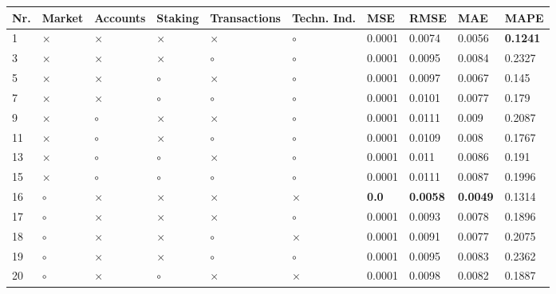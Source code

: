 \begin{table}[H]
\centering
\begin{tabular}{|P{0.7cm}|P{1.3cm}P{1.3cm}P{1.3cm}P{1.3cm}P{1.3cm}|P{1.1cm}P{1.1cm}P{1.1cm}P{1.1cm}|}
\hline
 Nr. &   Market & Accounts &  Staking & Transactions & Techn. Ind. &          MSE &            RMSE &             MAE &            MAPE \\
 & $\times$ & $\times$ & $\times$ &     $\times$ &     $\circ$ &       0.0001 &          0.0074 &          0.0056 & \textbf{0.1241} \\
   3 & $\times$ & $\times$ & $\times$ &      $\circ$ &     $\circ$ &       0.0001 &          0.0095 &          0.0084 &          0.2327 \\
   5 & $\times$ & $\times$ &  $\circ$ &     $\times$ &     $\circ$ &       0.0001 &          0.0097 &          0.0067 &           0.145 \\
   7 & $\times$ & $\times$ &  $\circ$ &      $\circ$ &     $\circ$ &       0.0001 &          0.0101 &          0.0077 &           0.179 \\
   9 & $\times$ &  $\circ$ & $\times$ &     $\times$ &     $\circ$ &       0.0001 &          0.0111 &           0.009 &          0.2087 \\
  11 & $\times$ &  $\circ$ & $\times$ &      $\circ$ &     $\circ$ &       0.0001 &          0.0109 &           0.008 &          0.1767 \\
  13 & $\times$ &  $\circ$ &  $\circ$ &     $\times$ &     $\circ$ &       0.0001 &           0.011 &          0.0086 &           0.191 \\
  15 & $\times$ &  $\circ$ &  $\circ$ &      $\circ$ &     $\circ$ &       0.0001 &          0.0111 &          0.0087 &          0.1996 \\
  16 &  $\circ$ & $\times$ & $\times$ &     $\times$ &    $\times$ & \textbf{0.0} & \textbf{0.0058} & \textbf{0.0049} &          0.1314 \\
  17 &  $\circ$ & $\times$ & $\times$ &     $\times$ &     $\circ$ &       0.0001 &          0.0093 &          0.0078 &          0.1896 \\
  18 &  $\circ$ & $\times$ & $\times$ &      $\circ$ &    $\times$ &       0.0001 &          0.0091 &          0.0077 &          0.2075 \\
  19 &  $\circ$ & $\times$ & $\times$ &      $\circ$ &     $\circ$ &       0.0001 &          0.0095 &          0.0083 &          0.2362 \\
  20 &  $\circ$ & $\times$ &  $\circ$ &     $\times$ &    $\times$ &       0.0001 &          0.0098 &          0.0082 &          0.1887 \\

\end{tabular}
\end{table}
